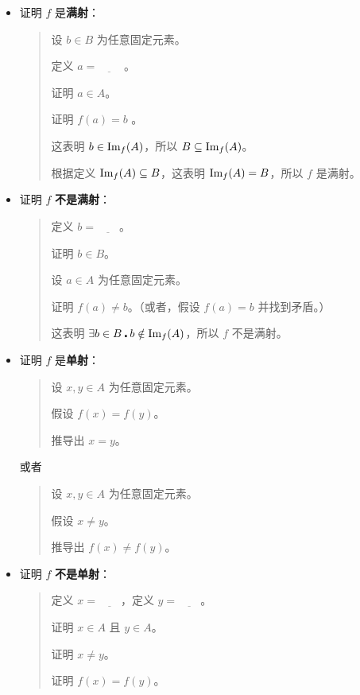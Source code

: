 \begin{itemize}
    \item 证明 $f$ 是\textbf{满射}：
          \begin{quote}
              设 $b \in B$ 为任意固定元素。

              定义 $a=\underline{\qquad}$ 。

              证明 $a \in A$。

              证明 $f(a) = b$ 。

              这表明 $b \in \text{Im}_f (A)$，所以 $B \subseteq \text{Im}_f (A)$。

              根据定义 $\text{Im}_f (A) \subseteq B$，这表明 $\text{Im}_f (A) = B$，所以 $f$ 是满射。
          \end{quote}
    \item 证明 $f$ \textbf{不是满射}：
          \begin{quote}
              定义 $b=\underline{\qquad}$。

              证明 $b \in B$。

              设 $a \in A$ 为任意固定元素。

              证明 $f(a) \ne b$。（或者，假设 $f(a) = b$ 并找到矛盾。）

              这表明 $\exists b \in B \centerdot b \notin \text{Im}_f (A)$，所以 $f$ 不是满射。
          \end{quote}
    \item 证明 $f$ 是\textbf{单射}：
          \begin{quote}
              设 $x,y \in A$ 为任意固定元素。

              假设 $f(x) = f(y)$。

              推导出 $x = y$。
          \end{quote}
          或者
          \begin{quote}
              设 $x,y \in A$ 为任意固定元素。

              假设 $x \ne y$。

              推导出 $f(x) \ne f(y)$。
          \end{quote}
    \item 证明 $f$ \textbf{不是单射}：
          \begin{quote}
              定义 $x=\underline{\qquad}$，定义 $y=\underline{\qquad}$。

              证明 $x \in A$ 且 $y \in A$。

              证明 $x \ne y$。

              证明 $f(x) = f(y)$。


\end{quote}
\end{itemize}
